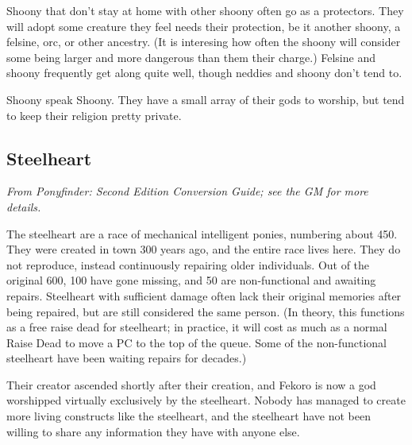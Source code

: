 \documentclass{report}
\begin{document}
Shoony that don't stay at home with other shoony often go as a protectors. They
will adopt some creature they feel needs their protection, be it another shoony,
a felsine, orc, or other ancestry. (It is interesing how often the shoony will
consider some being larger and more dangerous than them their charge.) Felsine and
shoony frequently get along quite well, though neddies and shoony don't tend to.

Shoony speak Shoony. They have a small array of their gods to worship, but tend to
keep their religion pretty private.

\subsection{Steelheart}

\emph{From \emph{Pony\-finder: Second Edition Conversion Guide}; see the GM
for more details.}

The steelheart are a race of mechanical intelligent ponies, numbering about 450.
They were created in town 300 years ago, and the entire race lives here. They
do not reproduce, instead continuously repairing older individuals. Out of the
original 600, 100 have gone missing, and 50 are non-functional and awaiting
repairs. Steelheart with sufficient damage often lack their original memories
after being repaired, but are still considered the same person. (In theory,
this functions as a free raise dead for steelheart; in practice, it will
cost as much as a normal Raise Dead to move a PC to the top of the queue. Some
of the non-functional steelheart have been waiting repairs for decades.)

Their creator ascended shortly after their creation, and Fekoro is now a god
worshipped virtually exclusively by the steelheart. Nobody has managed to create
more living constructs like the steelheart, and the steelheart have not been
willing to share any information they have with anyone else.
\end{document}
